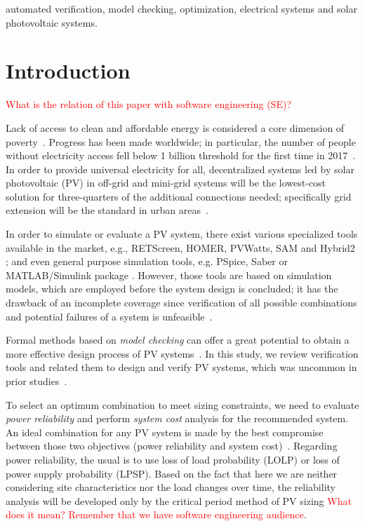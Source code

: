 \documentclass[10pt,conference]{IEEEtran}
\begin{document}
\begin{IEEEkeywords}
automated verification, model checking, optimization, electrical systems and solar photovoltaic systems.
\end{IEEEkeywords}


\section{Introduction}

\textcolor{red}{What is the relation of this paper with software engineering (SE)?}

Lack of access to clean and affordable energy is considered a core dimension of poverty~\cite{Hussein2012}. Progress has been made worldwide; in particular, the number of people without electricity access fell below 1 billion threshold for the first time in 2017~\cite{IEAweo2018}. In order to provide universal electricity for all, decentralized systems led by solar photovoltaic (PV) in off-grid and mini-grid systems will be the lowest-cost solution for three-quarters of the additional connections needed; specifically grid extension will be the standard in urban areas~\cite{IEAweo2018}.

In order to simulate or evaluate a PV system, there exist various specialized tools available in the market, e.g., RETScreen, HOMER, PVWatts, SAM and Hybrid2 \cite{Pradhan,Swarnkar,NRELDobos,NRELBlair,Mills}; and even general purpose simulation tools, e.g. PSpice, Saber or MATLAB/Simulink package \cite{Gow1999,Benatiallah2017}. However, those tools are based on simulation models, which are employed before the system design is concluded; it has the drawback of an incomplete coverage since verification of all possible combinations and potential failures of a system is unfeasible~\cite{ClarkeHV18}.

Formal methods based on \textit{model checking} can offer a great potential to obtain a more effective design process of PV systems~\cite{ClarkeHV18}. In this study, we review verification tools and related them to design and verify PV systems, which was uncommon in prior studies~\cite{abs-1811-09438}. 

To select an optimum combination to meet sizing constraints, we need to evaluate \textit{power reliability} and perform \textit{system cost} analysis for the recommended system. An ideal combination for any PV system is made by the best compromise between those two objectives (power reliability and system cost)~\cite{Alsadi2018}. 
Regarding power reliability, the usual is to use loss of load probability (LOLP) or loss of power supply probability (LPSP). Based on the fact that here we are neither considering site characteristics nor the load changes over time, the reliability analysis will be developed only by the critical period method of PV sizing \textcolor{red}{What does it mean? Remember that we have software engineering audience}. 
\end{document}
